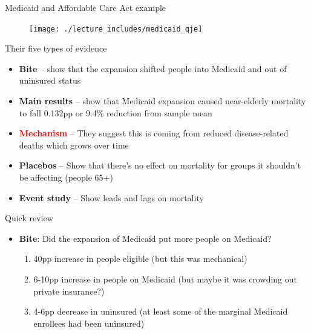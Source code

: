 \documentclass{beamer}
\begin{document}
\begin{frame}{Medicaid and Affordable Care Act example}

\begin{figure}
\texttt{[image: ./lecture\_includes/medicaid\_qje]}
\end{figure}

\end{frame}

\begin{frame}{Their five types of evidence}

\begin{itemize}
\item \textbf{Bite} -- show that the expansion shifted people into Medicaid and out of uninsured status
\item \textbf{Main results} -- show that Medicaid expansion caused near-elderly mortality to fall 0.132pp or 9.4\% reduction from sample mean
\item \textcolor{red}{\textbf{Mechanism}} -- They suggest this is coming from reduced disease-related deaths which grows over time
\item \textbf{Placebos} -- Show that there's no effect on mortality for groups it shouldn't be affecting (people 65+)
\item \textbf{Event study} -- Show leads and lags on mortality
\end{itemize}

\end{frame}





\begin{frame}{Quick review}

\begin{itemize}

\item \textbf{Bite}: Did the expansion of Medicaid put more people on Medicaid?
	\begin{enumerate}
	\item 40pp increase in people eligible (but this was mechanical)
	\item 6-10pp increase in people on Medicaid (but maybe it was crowding out private insurance?)
	\item 4-6pp decrease in uninsured (at least some of the marginal Medicaid enrollees had been uninsured)
	\end{enumerate}
\end{itemize}

\end{frame}
\end{document}
